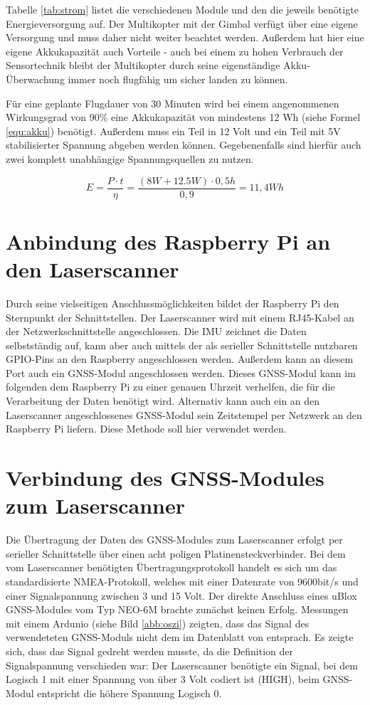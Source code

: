 \documentclass[a4paper,12pt,bibliography=totoc, listof=totoc,titlepage]{scrreprt}
\begin{document}
Tabelle \ref{tab:strom} listet die verschiedenen Module und den die jeweils benötigte Energieversorgung auf. Der Multikopter mit der Gimbal verfügt über eine eigene Versorgung und muss daher nicht weiter beachtet werden. Außerdem hat hier eine eigene Akkukapazität auch Vorteile - auch bei einem zu hohen Verbrauch der Sensortechnik bleibt der Multikopter durch seine eigenständige Akku-Überwachung immer noch flugfähig um sicher landen zu können.

Für eine geplante Flugdauer von 30 Minuten wird bei einem angenommenen Wirkungsgrad von 90\% eine Akkukapazität von mindestens 12 Wh  (siehe Formel \ref{equ:akku}) benötigt. Außerdem muss ein Teil in 12 Volt und ein Teil mit 5V stabilisierter Spannung abgeben werden können. Gegebenenfalls sind hierfür auch zwei komplett unabhängige Spannungsquellen zu nutzen.

\begin{equation}
\label{equ:akku}
E = \frac{ P \cdot t}{\eta} = \frac{(8W + 12.5W) \cdot 0,5h}{0,9} = 11,4 Wh
\end{equation}

\section{Anbindung des Raspberry Pi an den Laserscanner}
Durch seine vielseitigen Anschlussmöglichkeiten bildet der Raspberry Pi den Sternpunkt der Schnittstellen. Der Laserscanner wird mit einem RJ45-Kabel an der Netzwerkschnittstelle angeschlossen. Die IMU zeichnet die Daten selbstständig auf, kann aber auch mittels der als serieller Schnittstelle nutzbaren GPIO-Pins an den Raspberry angeschlossen werden. Außerdem kann an diesem Port auch ein GNSS-Modul angeschlossen werden. Dieses GNSS-Modul kann im folgenden dem Raspberry Pi zu einer genauen Uhrzeit verhelfen, die für die Verarbeitung der Daten benötigt wird. Alternativ kann auch ein an den Laserscanner angeschlossenes GNSS-Modul sein Zeitstempel per Netzwerk an den Raspberry Pi liefern. Diese Methode soll hier verwendet werden.

\section{Verbindung des GNSS-Modules zum Laserscanner}
\label{s:GNSSAnschluss}
Die Übertragung der Daten des GNSS-Modules zum Laserscanner erfolgt per serieller Schnittstelle über einen acht poligen Platinensteckverbinder. Bei dem vom Laserscanner benötigten Übertragungsprotokoll handelt es sich um das standardisierte NMEA-Protokoll, welches mit einer Datenrate von 9600bit/s und einer Signalspannung zwischen 3 und 15 Volt. Der direkte Anschluss eines uBlox GNSS-Modules vom Typ NEO-6M brachte zunächst keinen Erfolg. Messungen mit einem Ardunio (siehe Bild \ref{abb:oszi}) zeigten, dass das Signal des verwendeteten GNSS-Moduls nicht dem im Datenblatt von \citet[S. 3]{vlpInterface} entsprach. Es zeigte sich, dass das Signal gedreht werden musste, da die Definition der Signalspannung verschieden war: Der Laserscanner benötigte ein Signal, bei dem Logisch 1 mit einer Spannung von über 3 Volt \citep[S. 3]{vlpInterface} codiert ist (HIGH), beim GNSS-Modul entspricht  die höhere Spannung Logisch 0.
\end{document}
